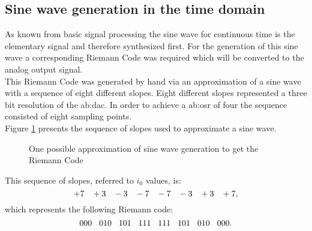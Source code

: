 \subsection{Sine wave generation in the time domain}
As known from basic signal processing 
 the sine wave for continuous time is the elementary signal and therefore synthesized first. 
For the generation of this sine wave a corresponding Riemann Code was required which will be converted to the analog output signal.\\
This Riemann Code was generated by hand via an approximation of a sine wave with a sequence of eight different slopes.
Eight different slopes represented a three bit resolution of the \gls{ab:dac}.
In order to achieve a \gls{ab:osr} of four the sequence consisted of eight sampling points.\\
Figure \ref{fig:RiemannCodeGenerationSineWave} presents the sequence of slopes used to approximate a sine wave. 




\begin{figure}[htb!]
   \centering 
   
   \caption{One possible approximation of sine wave generation to get the Riemann Code}
   \label{fig:RiemannCodeGenerationSineWave}
\end{figure}


This sequence of slopes, referred to $i_0$ values, is:
\begin{equation}
 +7\hspace{.3cm} +3\hspace{.3cm} -3\hspace{.3cm} -7\hspace{.3cm} -7\hspace{.3cm} -3\hspace{.3cm} +3\hspace{.3cm} +7,
 \end{equation} which represents the following Riemann code:
\begin{equation}
000\hspace{.3cm} 010\hspace{.3cm} 101\hspace{.3cm} 111\hspace{.3cm} 111\hspace{.3cm} 101\hspace{.3cm} 010\hspace{.3cm} 000.
\end{equation}
\label{eq:RiemannCodeSineWave} 
   
